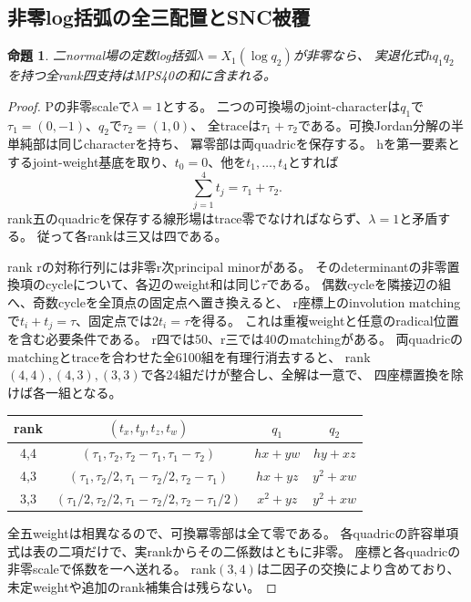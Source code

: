 \documentclass[a4paper,11pt]{ltjsarticle}
\newtheorem{proposition}{命題}[section]
\theoremstyle{definition}
\begin{document}
\subsection{非零log括弧の全三配置とSNC被覆}
\begin{proposition}\label{prop:two-quadrics-nonzero-lambda}
二normal場の定数log括弧$\lambda=X_1(\log q_2)$が非零なら、
実退化式$hq_1q_2$を持つ全rank四支持はMPS40の和に含まれる。
\end{proposition}
\begin{proof}
Pの非零scaleで$\lambda=1$とする。
二つの可換場のjoint-characterは$q_1$で$\tau_1=(0,-1)$、$q_2$で$\tau_2=(1,0)$、
全traceは$\tau_1+\tau_2$である。可換Jordan分解の半単純部は同じcharacterを持ち、
冪零部は両quadricを保存する。
hを第一要素とするjoint-weight基底を取り、$t_0=0$、他を$t_1,\ldots,t_4$とすれば
\[
 \sum_{j=1}^4t_j=\tau_1+\tau_2.
\]
rank五のquadricを保存する線形場はtrace零でなければならず、$\lambda=1$と矛盾する。
従って各rankは三又は四である。

rank rの対称行列には非零r次principal minorがある。
そのdeterminantの非零置換項のcycleについて、各辺のweight和は同じ$\tau$である。
偶数cycleを隣接辺の組へ、奇数cycleを全頂点の固定点へ置き換えると、
r座標上のinvolution matchingで$t_i+t_j=\tau$、固定点では$2t_i=\tau$を得る。
これは重複weightと任意のradical位置を含む必要条件である。
r四では50、r三では40のmatchingがある。
両quadricのmatchingとtraceを合わせた全6100組を有理行消去すると、
rank$(4,4),(4,3),(3,3)$で各24組だけが整合し、全解は一意で、
四座標置換を除けば各一組となる。
\begin{center}\small
\begin{tabular}{c|c|c|c}
rank&$(t_x,t_y,t_z,t_w)$&$q_1$&$q_2$\\\hline
4,4&$(\tau_1,\tau_2,\tau_2-\tau_1,\tau_1-\tau_2)$&$hx+yw$&$hy+xz$\\
4,3&$(\tau_1,\tau_2/2,\tau_1-\tau_2/2,\tau_2-\tau_1)$&$hx+yz$&$y^2+xw$\\
3,3&$(\tau_1/2,\tau_2/2,\tau_1-\tau_2/2,\tau_2-\tau_1/2)$&$x^2+yz$&$y^2+xw$
\end{tabular}
\end{center}
全五weightは相異なるので、可換冪零部は全て零である。
各quadricの許容単項式は表の二項だけで、実rankからその二係数はともに非零。
座標と各quadricの非零scaleで係数を一へ送れる。
rank$(3,4)$は二因子の交換により含めており、未定weightや追加のrank補集合は残らない。


\end{proof}
\end{document}
